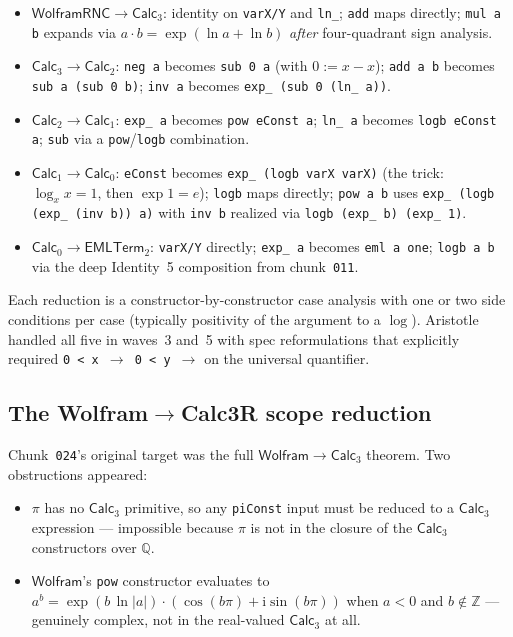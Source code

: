 \documentclass[11pt,a4paper]{article}
\theoremstyle{plain}
\theoremstyle{definition}
\newcommand{\Z}{\mathbb{Z}}
\newcommand{\Q}{\mathbb{Q}}
\newcommand{\imu}{\mathrm{i}}
\begin{document}
\begin{itemize}[leftmargin=*,nosep]
\item $\mathsf{WolframRNC}\to\mathsf{Calc}_3$: identity on
\texttt{varX/Y} and \texttt{ln\_}; \texttt{add} maps directly;
\texttt{mul a b} expands via $a\cdot b = \exp(\ln a + \ln b)$
\emph{after} four-quadrant sign analysis.
\item $\mathsf{Calc}_3\to\mathsf{Calc}_2$: \texttt{neg a} becomes
\texttt{sub 0 a} (with $0 := x-x$); \texttt{add a b} becomes
\texttt{sub a (sub 0 b)}; \texttt{inv a} becomes
\texttt{exp\_ (sub 0 (ln\_ a))}.
\item $\mathsf{Calc}_2\to\mathsf{Calc}_1$: \texttt{exp\_ a} becomes
\texttt{pow eConst a}; \texttt{ln\_ a} becomes
\texttt{logb eConst a}; \texttt{sub} via a \texttt{pow}/\texttt{logb}
combination.
\item $\mathsf{Calc}_1\to\mathsf{Calc}_0$: \texttt{eConst} becomes
\texttt{exp\_ (logb varX varX)} (the trick: $\log_x x = 1$, then
$\exp 1 = e$); \texttt{logb} maps directly; \texttt{pow a b} uses
\texttt{exp\_ (logb (exp\_ (inv b)) a)} with \texttt{inv b} realized
via \texttt{logb (exp\_ b) (exp\_ 1)}.
\item $\mathsf{Calc}_0\to\mathsf{EMLTerm}_2$: \texttt{varX/Y} directly;
\texttt{exp\_ a} becomes \texttt{eml a one}; \texttt{logb a b} via
the deep Identity~5 composition from chunk~\texttt{011}.
\end{itemize}

Each reduction is a constructor-by-constructor case analysis with one
or two side conditions per case (typically positivity of the argument
to a $\log$).  Aristotle handled all five in waves~3 and~5 with
spec reformulations that explicitly required \texttt{0 < x $\to$
0 < y $\to$} on the universal quantifier.

\subsection{The Wolfram$\to$Calc3R scope reduction}

Chunk~\texttt{024}'s original target was the full
$\mathsf{Wolfram}\to\mathsf{Calc}_3$ theorem.  Two obstructions appeared:

\begin{itemize}[leftmargin=*,nosep]
\item $\pi$ has no $\mathsf{Calc}_3$ primitive, so any
\texttt{piConst} input must be reduced to a $\mathsf{Calc}_3$
expression --- impossible because $\pi$ is not in the closure of the
$\mathsf{Calc}_3$ constructors over $\Q$.
\item $\mathsf{Wolfram}$'s \texttt{pow} constructor evaluates to
$a^b = \exp(b\,\ln|a|)\cdot(\cos(b\pi)+\imu\sin(b\pi))$ when $a<0$
and $b\notin\Z$ --- genuinely complex, not in the real-valued
$\mathsf{Calc}_3$ at all.
\end{itemize}
\end{document}

